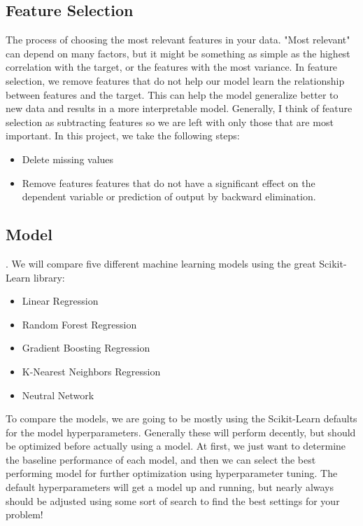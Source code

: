 \documentclass{article}
\begin{document}
\subsection*{Feature Selection}
 The process of choosing the most relevant features in your data. "Most relevant" can depend on many factors, but it might be something as simple as the highest correlation with the target, or the features with the most variance. In feature selection, we remove features that do not help our model learn the relationship between features and the target. This can help the model generalize better to new data and results in a more interpretable model. Generally, I think of feature selection as subtracting features so we are left with only those that are most important.
In this project, we take the following steps:
\begin{itemize}
    \item Delete missing values
    \item Remove features features that do not have a significant effect on the dependent variable or prediction of output by backward elimination.
\end{itemize}


\subsection*{Model}.
We will compare five different machine learning models using the great Scikit-Learn library:
\begin{itemize}
    \item Linear Regression
    \item Random Forest Regression
    \item Gradient Boosting Regression
    \item K-Nearest Neighbors Regression
    \item Neutral Network
\end{itemize}

To compare the models, we are going to be mostly using the Scikit-Learn defaults for the model hyperparameters. Generally these will perform decently, but should be optimized before actually using a model. At first, we just want to determine the baseline performance of each model, and then we can select the best performing model for further optimization using hyperparameter tuning. The default hyperparameters will get a model up and running, but nearly always should be adjusted using some sort of search to find the best settings for your problem!
\end{document}
